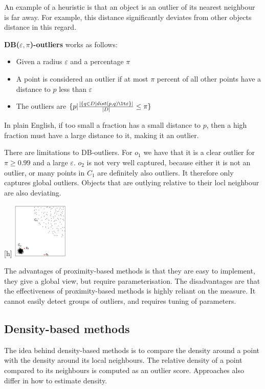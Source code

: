     An example of a heuristic is that an object is an outlier of its nearest neighbour is far away. For example, this distance significantly deviates from other objects distance in this regard. 
    
    \textbf{DB($\varepsilon, \pi$)-outliers} works as follows:
    \begin{itemize}
        \item Given a radius $\varepsilon$ and a percentage $\pi$
        \item A point is considered an outlier if at most $\pi$ percent of all other points have a distance to $p$ less than $\varepsilon$
        \item The outliers are $\set{
            p | \frac{
            |\set{q \in D | dist(p,q) \lt \varepsilon}|}{|D|}
            \leq \pi}$
    \end{itemize}
    In plain English, if too small a fraction has a small distance to $p$, then a high fraction must have a large distance to it, making it an outlier. 
    
    There are limitations to DB-outliers.
    For $o_1$ we have that it is a clear outlier for $\pi \geq 0.99$ and a large $\varepsilon$. $o_2$ is not very well captured, because either it is not an outlier, or many points in $C_1$ are definitely also outliers. It therefore only captures global outliers. Objects that are outlying relative to their locl neighbour are also deviating.
    
    \begin{center}[h]
        \includegraphics[width=0.2\textwidth]{images/DBOUTLIERS.png}
    \end{center}
    
    The advantages of proximity-based methods is that they are easy to implement, they give a global view, but require parameterisation. The disadvantages are that the effectiveness of proximity-based methods is highly reliant on the measure. It cannot easily detect groups of outliers, and requires tuning of parameters.
    
\subsection{Density-based methods}
    The idea behind density-based methods is to compare the density around a point with the density around its local neighbours. The relative density of a point compared to its neighbours is computed as an outlier score. Approaches also differ in how to estimate density.
    
